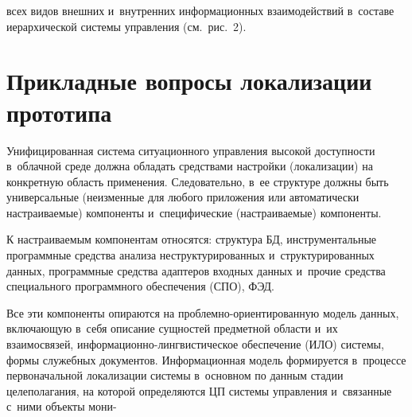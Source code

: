 \begin{multicols}{2}

\noindent
 всех видов 
внешних и~внут\-рен\-них информационных взаимодействий в~со\-ста\-ве 
иерархической сис\-те\-мы управ\-ле\-ния (см.\ рис.~2).
    
\section{Прикладные вопросы локализации прототипа}

    Унифицированная сис\-те\-ма ситуационного управ\-ле\-ния высокой 
доступности в~облачной среде должна обладать средствами настройки 
(локализации) на конкретную об\-ласть применения. Следовательно, в~ее 
структуре должны быть универсальные (неизменные для любого приложения 
или автоматически настраиваемые) компоненты и~специфические 
(на\-стра\-и\-ва\-емые) компоненты. 
    
    К настраиваемым компонентам относятся: структура БД, 
инструментальные программные средства анализа неструктурированных 
и~структурированных данных, программные средства адаптеров входных 
данных и~прочие средства специального программного обеспечения (СПО), 
ФЭД. 



Все эти 
компоненты опираются на проб\-лем\-но-ори\-ен\-ти\-ро\-ван\-ную модель данных, 
включающую в~себя описание сущностей предметной об\-ласти и~их 
взаимосвязей, ин\-фор\-ма\-ци\-он\-но-линг\-ви\-сти\-че\-ское обеспечение
(ИЛО)  сис\-те\-мы, 
формы служебных документов. Информационная модель формируется 
в~процессе первоначальной локализации сис\-те\-мы в~основном по данным 
стадии целеполагания, на которой определяются ЦП сис\-те\-мы управ\-ле\-ния 
и~связанные с~ними объекты мони-\linebreak\vspace*{-12pt}

\pagebreak

\end{multicols}

\begin{figure*} %
\vspace*{1pt}
 \begin{center}
 \mbox{%
 \epsfxsize=165.77mm 
 }
 \end{center}
\vspace*{-6pt}
\vspace*{9pt}
\end{figure*}

